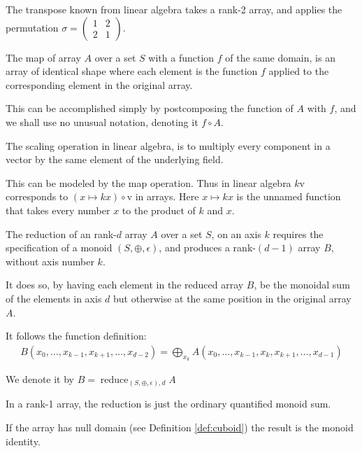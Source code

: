 \documentclass{DIKU-report-variant}
\newcommand\mrm[1]{\mathrm{#1}}
\newcommand\brm[1]{\bm{\mrm{#1}}}
\newcommand\reduce{\operatorname*{\brm{reduce}}}
\begin{document}
\begin{example}
  \label{ex:transpose}
  The transpose known from linear algebra takes a rank-2 array, and
  applies the permutation \(\sigma = \left(\begin{smallmatrix} 1 & 2 \\ 2 & 1 \end{smallmatrix}\right)\).
\end{example}

\begin{definition}
  \label{def:map}
  The map of array \(A\) over a set \(S\) with a function \(f\) of the same domain,
  is an array of identical shape where each element is the function \(f\) applied to
  the corresponding element in the original array.

  This can be accomplished simply by postcomposing the function of \(A\)
  with \(f\), and we shall use no unusual notation, denoting it \(f \circ A\).
\end{definition}

\begin{example}
  \label{ex:scaling}
  The scaling operation in linear algebra, is to multiply every component in
  a vector by the same element of the underlying field.

  This can be modeled by the map operation. Thus in linear algebra \(k\brm v\)
  corresponds to \((x \mapsto kx) \circ \brm v\) in arrays. Here \(x \mapsto kx\) is
  the unnamed function that takes every number \(x\) to the product of \(k\) and \(x\).
\end{example}

\begin{definition}
  \label{def:reduce}
  The reduction of an rank-\(d\) array \(A\) over a set \(S\), on
  an axis \(k\) requires the specification of a monoid
  \((S, \oplus, \epsilon)\), and produces a rank-\((d-1)\) array \(B\), without
  axis number \(k\).

  It does so, by having each element in the reduced array \(B\), be the monoidal sum
  of the elements in axis \(d\) but otherwise at the same position in the original array \(A\).

  It follows the function definition:
  \begin{align*}
    B(x_0,\dots,x_{k-1},x_{k+1},\dots,x_{d-2}) = \bigoplus_{x_k} A(x_0,\dots,x_{k-1},x_k,x_{k+1},\dots,x_{d-1})
  \end{align*}

  We denote it by \( B = \reduce_{(S, \oplus, \epsilon),d} A \)

  In a rank-1 array, the reduction is just the ordinary quantified monoid sum.

  If the array has null domain (see Definition \ref{def:cuboid}) the result is
  the monoid identity.
\end{definition}
\end{document}
